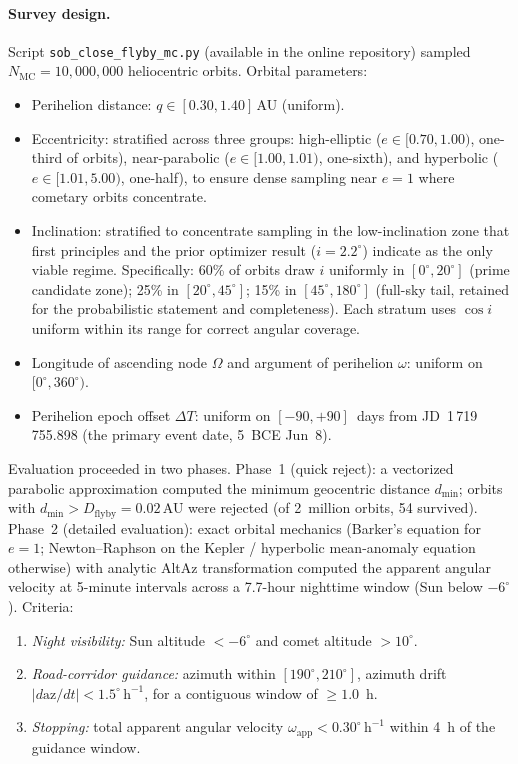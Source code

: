 \documentclass[11pt,a4paper]{article}
\begin{document}
\paragraph{Survey design.}
Script \texttt{sob\_close\_flyby\_mc.py} (available in the online repository)
sampled $N_\mathrm{MC} = 10{,}000{,}000$ heliocentric orbits. Orbital parameters:
\begin{itemize}
  \item Perihelion distance: $q \in [0.30, 1.40]$\,AU (uniform).
  \item Eccentricity: stratified across three groups: high-elliptic
    ($e \in [0.70, 1.00)$, one-third of orbits), near-parabolic
    ($e \in [1.00, 1.01)$, one-sixth), and hyperbolic ($e \in [1.01, 5.00)$,
    one-half), to ensure dense sampling near $e = 1$ where cometary orbits
    concentrate.
  \item Inclination: stratified to concentrate sampling in the low-inclination
    zone that first principles and the prior optimizer result ($i = 2.2^\circ$)
    indicate as the only viable regime. Specifically: 60\% of orbits draw $i$
    uniformly in $[0^\circ, 20^\circ]$ (prime candidate zone); 25\% in
    $[20^\circ, 45^\circ]$; 15\% in $[45^\circ, 180^\circ]$ (full-sky tail,
    retained for the probabilistic statement and completeness). Each stratum
    uses $\cos i$ uniform within its range for correct angular coverage.
  \item Longitude of ascending node $\Omega$ and argument of perihelion $\omega$:
    uniform on $[0^\circ, 360^\circ)$.
  \item Perihelion epoch offset $\Delta T$: uniform on $[-90, +90]$~days from
    JD~1\,719\,755.898 (the primary event date, 5~BCE Jun~8).
\end{itemize}

Evaluation proceeded in two phases. Phase~1 (quick reject): a vectorized
parabolic approximation computed the minimum geocentric distance $d_\mathrm{min}$;
orbits with $d_\mathrm{min} > D_\mathrm{flyby} = 0.02$\,AU were rejected (of
2~million orbits, 54 survived). Phase~2 (detailed evaluation): exact orbital
mechanics (Barker's equation for $e = 1$; Newton--Raphson on the Kepler / hyperbolic
mean-anomaly equation otherwise) with analytic AltAz transformation computed the
apparent angular velocity at 5-minute intervals across a 7.7-hour nighttime window
(Sun below $-6^\circ$). Criteria:
\begin{enumerate}
  \item \textit{Night visibility:} Sun altitude $< -6^\circ$ and comet altitude
    $> 10^\circ$.
  \item \textit{Road-corridor guidance:} azimuth within $[190^\circ, 210^\circ]$,
    azimuth drift $|d\mathrm{az}/dt| < 1.5^\circ\,\mathrm{h}^{-1}$, for a
    contiguous window of $\geq 1.0$~h.
  \item \textit{Stopping:} total apparent angular velocity
    $\omega_\mathrm{app} < 0.30^\circ\,\mathrm{h}^{-1}$ within 4~h of the
    guidance window.
\end{enumerate}
\end{document}

